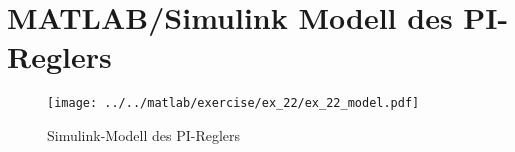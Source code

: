 \section{MATLAB/Simulink Modell des PI-Reglers}



\begin{figure}[h!]
	\centering
	\texttt{[image: ../../matlab/exercise/ex\_22/ex\_22\_model.pdf]}
	\caption{Simulink-Modell des PI-Reglers}
	\label{fig:ex_22_model}
\end{figure}
